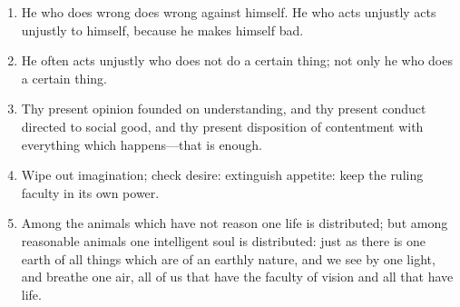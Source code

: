 \begin{enumerate}
\item He who does wrong does wrong against himself. He who acts unjustly acts unjustly to himself, because he makes himself bad.

\item He often acts unjustly who does not do a certain thing; not only he who does a certain thing.

\item Thy present opinion founded on understanding, and thy present conduct directed to social good, and thy present disposition of contentment with everything which happens—that is enough.

\item Wipe out imagination; check desire: extinguish appetite: keep the ruling faculty in its own power.

\item Among the animals which have not reason one life is distributed; but among reasonable animals one intelligent soul is distributed: just as there is one earth of all things which are of an earthly nature, and we see by one light, and breathe one air, all of us that have the faculty of vision and all that have life.


\end{enumerate}
